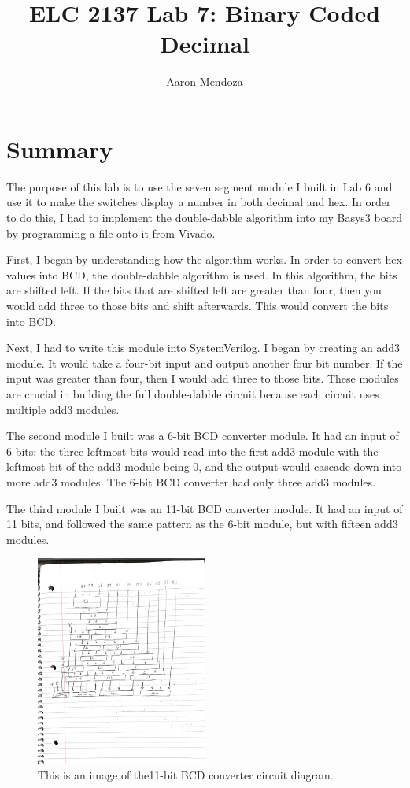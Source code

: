 \documentclass[11pt]{article}
\begin{document}
\title{ELC 2137 Lab 7: Binary Coded Decimal}
\author{Aaron Mendoza}

\maketitle


\section*{Summary}

The purpose of this lab is to use the seven segment module I built in Lab 6 and use it to make the switches display a number in both decimal and hex. In order to do this, I had to implement the double-dabble algorithm into my Basys3 board by programming a file onto it from Vivado.

First, I began by understanding how the algorithm works. In order to convert hex values into BCD, the double-dabble algorithm is used. In this algorithm, the bits are shifted left. If the bits that are shifted left are greater than four, then you would add three to those bits and shift afterwards. This would convert the bits into BCD. 

Next, I had to write this module into SystemVerilog. I began by creating an add3 module. It would take a four-bit input and output another four bit number. If the input was greater than four, then I would add three to those bits. These modules are crucial in building the full double-dabble circuit because each circuit uses multiple add3 modules.

The second module I built was a 6-bit BCD converter module. It had an input of 6 bits; the three leftmost bits would read into the first add3 module with the leftmost bit of the add3 module being 0, and the output would cascade down into more add3 modules. The 6-bit BCD converter had only three add3 modules.

The third module I built was an 11-bit BCD converter module. It had an input of 11 bits, and followed the same pattern as the 6-bit module, but with fifteen add3 modules. 

\begin{figure}[ht]\centering
\includegraphics[width=0.5\textwidth]{eleven_BCD_diag}
\caption{This is an image of the11-bit BCD converter circuit diagram.}
\label{fig:original_logo}
\end{figure}
\end{document}
